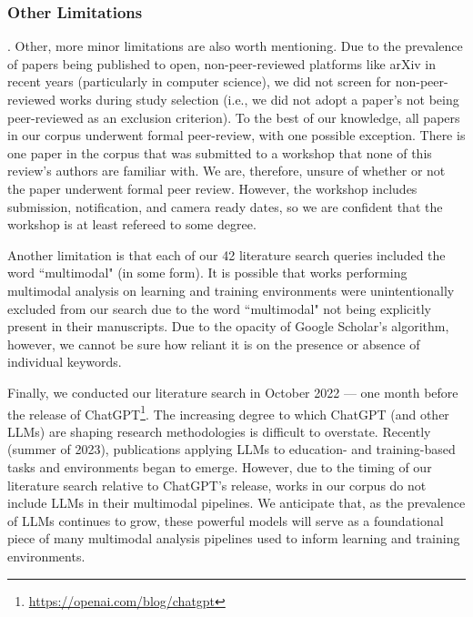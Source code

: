 \documentclass[manuscript,screen,review]{acmart}
\begin{document}
\subsubsection{Other Limitations}.
Other, more minor limitations are also worth mentioning. Due to the prevalence of papers being published to open, non-peer-reviewed platforms like arXiv in recent years (particularly in computer science), we did not screen for non-peer-reviewed works during study selection (i.e., we did not adopt a paper's not being peer-reviewed as an exclusion criterion). To the best of our knowledge, all papers in our corpus underwent formal peer-review, with one possible exception. There is one paper in the corpus that was submitted to a workshop that none of this review's authors are familiar with. We are, therefore, unsure of whether or not the paper underwent formal peer review. However, the workshop includes submission, notification, and camera ready dates, so we are confident that the workshop is at least refereed to some degree. 

Another limitation is that each of our 42 literature search queries included the word ``multimodal" (in some form). It is possible that works performing multimodal analysis on learning and training environments were unintentionally excluded from our search due to the word ``multimodal" not being explicitly present in their manuscripts. Due to the opacity of Google Scholar's algorithm, however, we cannot be sure how reliant it is on the presence or absence of individual keywords. 

Finally, we conducted our literature search in October 2022 --- one month before the release of ChatGPT\footnote{\href{https://openai.com/blog/chatgpt}{https://openai.com/blog/chatgpt}}. The increasing degree to which ChatGPT (and other LLMs) are shaping research methodologies is difficult to overstate. Recently (summer of 2023), publications applying LLMs to education- and training-based tasks and environments began to emerge. However, due to the timing of our literature search relative to ChatGPT's release, works in our corpus do not include LLMs in their multimodal pipelines. We anticipate that, as the prevalence of LLMs continues to grow, these powerful models will serve as a foundational piece of many multimodal analysis pipelines used to inform learning and training environments.
\end{document}

